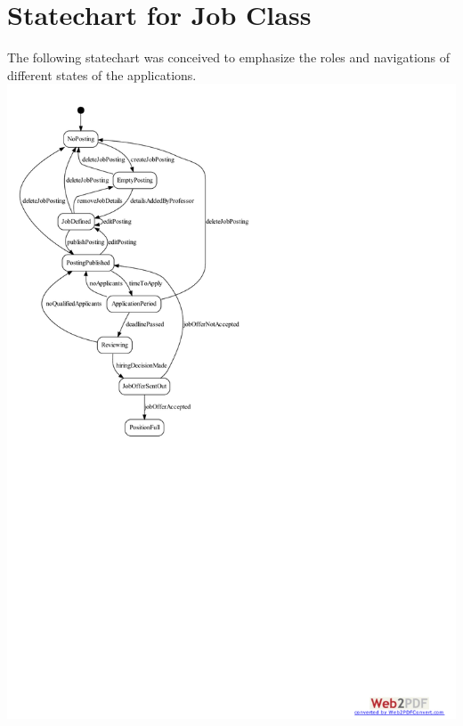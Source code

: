 \documentclass[12pt,openany]{report}
\begin{document}
\chapter{Statechart for Job Class}
The following statechart was conceived to emphasize the roles and navigations of different states of
the applications.
\includegraphics{model/Diagrams/StateDiagram/StateChartDiagram.pdf}
\end{document}
